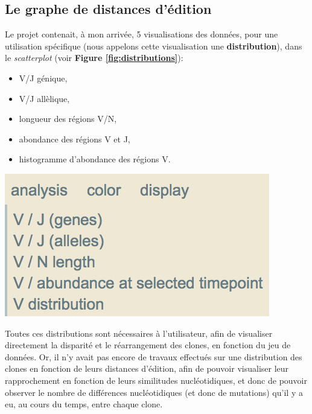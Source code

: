 \documentclass[pdftex,12pt,a4paper]{report}
\begin{document}
\begin{spacing}{1.2}
\chapter{Le graphe de distances d'édition}

Le projet contenait, à mon arrivée, 5 visualisations des données, pour une utilisation spécifique (nous appelons cette visualisation une \textbf{distribution}), dans le \textit{scatterplot} (voir \textbf{Figure \ref{fig:distributions}}):
\\[2mm]
\begin{minipage}{0.5\textwidth}
\begin{itemize}
\item V/J génique,
\item V/J allèlique,
\item longueur des régions V/N,
\item abondance des régions V et J,
\item histogramme d'abondance des régions V.
\end{itemize}
\end{minipage}
\begin{minipage}{0.5\textwidth}
	\includegraphics[width=\textwidth]{img/5distributions.jpg}
	\label{fig:distributions}
	\vfill
\end{minipage}

Toutes ces distributions sont nécessaires à l'utilisateur, afin de visualiser directement la disparité et le réarrangement des clones, en fonction du jeu de données. Or, il n'y avait pas encore de travaux effectués sur une distribution des clones en fonction de leurs distances d'édition, afin de pouvoir visualiser leur rapprochement en fonction de leurs similitudes nucléotidiques, et donc de pouvoir observer le nombre de différences nucléotidiques (et donc de mutations) qu'il y a eu, au cours du temps, entre chaque clone.


\end{spacing}
\end{document}

